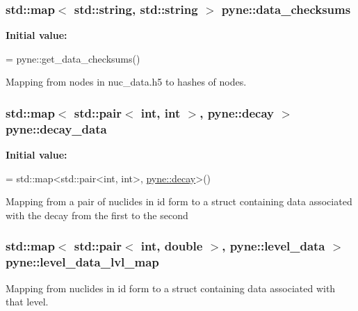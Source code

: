 \subsubsection[{\texorpdfstring{data\+\_\+checksums}{data_checksums}}]{\setlength{\rightskip}{0pt plus 5cm}std\+::map$<$ std\+::string, std\+::string $>$ pyne\+::data\+\_\+checksums}\hypertarget{namespacepyne_a092bde815498a51a7532e3021a63ede5}{}\label{namespacepyne_a092bde815498a51a7532e3021a63ede5}
{\bfseries Initial value\+:}
\begin{DoxyCode}
=
  pyne::get\_data\_checksums()
\end{DoxyCode}


Mapping from nodes in nuc\+\_\+data.\+h5 to hashes of nodes. 

\subsubsection[{\texorpdfstring{decay\+\_\+data}{decay_data}}]{\setlength{\rightskip}{0pt plus 5cm}std\+::map$<$ std\+::pair$<$ int, int $>$, {\bf pyne\+::decay} $>$ pyne\+::decay\+\_\+data}\hypertarget{namespacepyne_ac880c3701eca3453cb9cdfab30195d65}{}\label{namespacepyne_ac880c3701eca3453cb9cdfab30195d65}
{\bfseries Initial value\+:}
\begin{DoxyCode}
= 
  std::map<std::pair<int, int>, \hyperlink{structpyne_1_1decay}{pyne::decay}>()
\end{DoxyCode}
Mapping from a pair of nuclides in id form to a struct containing data associated with the decay from the first to the second 
\subsubsection[{\texorpdfstring{level\+\_\+data\+\_\+lvl\+\_\+map}{level_data_lvl_map}}]{\setlength{\rightskip}{0pt plus 5cm}std\+::map$<$ std\+::pair$<$ int, double $>$, {\bf pyne\+::level\+\_\+data} $>$ pyne\+::level\+\_\+data\+\_\+lvl\+\_\+map}\hypertarget{namespacepyne_aa5b6136e3970959756640b867754bb62}{}\label{namespacepyne_aa5b6136e3970959756640b867754bb62}
Mapping from nuclides in id form to a struct containing data associated with that level. 
